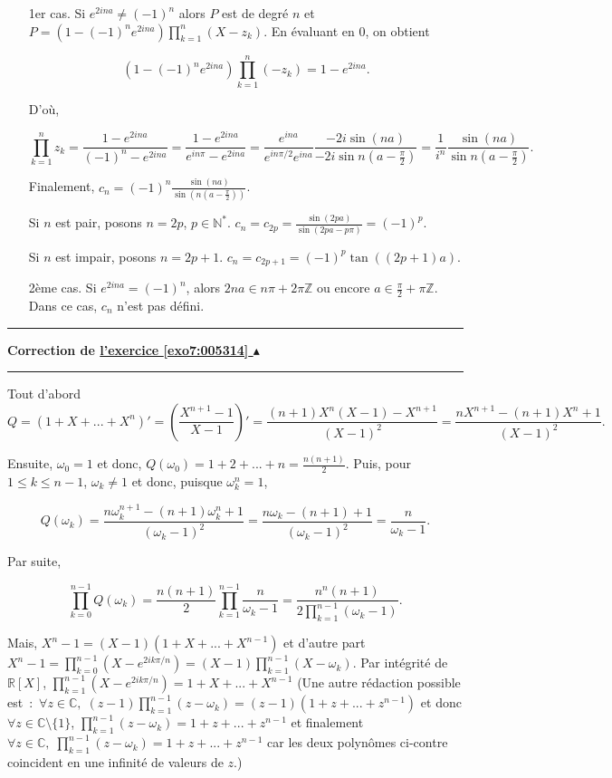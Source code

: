 \documentclass[11pt,a4paper]{article}
\newcommand{\Nn}{\mathbb{N}} \newcommand{\N}{\mathbb{N}}
\newcommand{\Zz}{\mathbb{Z}} \newcommand{\Z}{\mathbb{Z}}
\newcommand{\Rr}{\mathbb{R}} \newcommand{\R}{\mathbb{R}}
\newcommand{\Cc}{\mathbb{C}} \newcommand{\C}{\mathbb{C}}
\newcounter{exo}
\newcommand{\correction}[1]{\hypertarget{cor7:#1}{}\label{cor7:#1}{\bf Correction de \hyperlink{exo7:#1}{l'exercice \ref{exo7:#1} $\blacktriangle$}}\vspace{1mm}\hrule\vspace{1mm}}
\newcommand{\fincorrection}{\vspace{1mm}\hrule\vspace*{7mm}}
\begin{document}
\begin{enumerate}
\begin{itemize}
\item[1er cas.] Si $e^{2ina}\neq(-1)^n$ alors $P$ est de degré $n$ et $P=(1-(-1)^ne^{2ina})\prod_{k=1}^{n}(X-z_k)$. En évaluant en $0$, on obtient

$$(1-(-1)^ne^{2ina})\prod_{k=1}^{n}(-z_k)=1-e^{2ina}.$$

D'où,

$$\prod_{k=1}^{n}z_k=\frac{1-e^{2ina}}{(-1)^n-e^{2ina}}=\frac{1-e^{2ina}}{e^{in\pi}-e^{2ina}}=\frac{e^{ina}}{e^{in\pi/2}e^{ina}}\frac{-2i\sin(na)}{-2i\sin n(a-\frac{\pi}{2})}=\frac{1}{i^n} \frac{\sin(na)}{\sin n(a-\frac{\pi}{2})}.$$

Finalement, $c_n=(-1)^n\frac{\sin(na)}{\sin(n(a-\frac{\pi}{2}))}$.

Si $n$ est pair, posons $n=2p$, $p\in\Nn^*$. $c_n=c_{2p}=\frac{\sin(2pa)}{\sin (2pa-p\pi)}=(-1)^p$.

Si $n$ est impair, posons $n=2p+1$. $c_n=c_{2p+1}=(-1)^p\tan((2p+1)a)$.

\item[2ème cas.] Si $e^{2ina}=(-1)^n$, alors $2na\in n\pi+2\pi\Zz$ ou encore $a\in\frac{\pi}{2}+\pi\Zz$. Dans ce cas, $c_n$ n'est pas défini.
\end{itemize}
\end{enumerate}

\fincorrection
\correction{005314}
Tout d'abord
$$Q=(1+X+...+X^n)'=(\frac{X^{n+1}-1}{X-1})'=\frac{(n+1)X^n(X-1)-X^{n+1}}{(X-1)^2}=\frac{nX^{n+1}-(n+1)X^n+1}{(X-1)^2}.$$

Ensuite, $\omega_0=1$ et donc, $Q(\omega_0)=1+2+...+n=\frac{n(n+1)}{2}$. Puis, pour $1\leq k\leq n-1$, $\omega_k\neq1$ et donc, puisque $\omega_k^n=1$,

$$Q(\omega_k)=\frac{n\omega_k^{n+1}-(n+1)\omega_k^n+1}{(\omega_k-1)^2}=\frac{n\omega_k-(n+1)+1}{(\omega_k-1)^2}
=\frac{n}{\omega_k-1}.$$

Par suite, 

$$\prod_{k=0}^{n-1}Q(\omega_k)=\frac{n(n+1)}{2}\prod_{k=1}^{n-1}\frac{n}{\omega_k-1}=\frac{n^n(n+1)}{2\prod_{k=1}^{n-1}(\omega_k-1)}.$$

Mais, $X^n-1=(X-1)(1+X+...+X^{n-1})$ et d'autre part $X^n-1=\prod_{k=0}^{n-1}(X-e^{2ik\pi/n})=(X-1)\prod_{k=1}^{n-1}(X-\omega_k)$. Par intégrité de $\Rr[X]$, $\prod_{k=1}^{n-1}(X-e^{2ik\pi/n})=1+X+...+X^{n-1}$ (Une autre rédaction possible est~:~$\forall z\in\Cc,\;(z-1)\prod_{k=1}^{n-1}(z-\omega_k)=(z-1)(1+z+...+z^{n-1})$ et donc $\forall z\in\Cc\setminus\{1\}$, $\prod_{k=1}^{n-1}(z-\omega_k)=1+z+...+z^{n-1}$ et finalement $\forall z\in\Cc,\;\prod_{k=1}^{n-1}(z-\omega_k)=1+z+...+z^{n-1}$ car les deux polynômes ci-contre coincident en une infinité de valeurs de $z$.)
\end{document}
